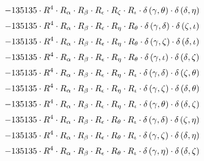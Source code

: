 \begin{subequations}
\begin{gather}
 \\[0.2em] \notag 		 - 135135 \cdot R^{4} \cdot R_{\alpha{}} \cdot R_{\beta{}} \cdot R_{\epsilon{}} \cdot R_{\zeta{}} \cdot R_{\iota{}} \cdot \delta{}\left(\gamma{}, \theta{}\right) \cdot \delta{}\left(\delta{}, \eta{}\right) 
 \\[0.2em] \notag 		 - 135135 \cdot R^{4} \cdot R_{\alpha{}} \cdot R_{\beta{}} \cdot R_{\epsilon{}} \cdot R_{\eta{}} \cdot R_{\theta{}} \cdot \delta{}\left(\gamma{}, \delta{}\right) \cdot \delta{}\left(\zeta{}, \iota{}\right) 
 \\[0.2em] \notag 		 - 135135 \cdot R^{4} \cdot R_{\alpha{}} \cdot R_{\beta{}} \cdot R_{\epsilon{}} \cdot R_{\eta{}} \cdot R_{\theta{}} \cdot \delta{}\left(\gamma{}, \zeta{}\right) \cdot \delta{}\left(\delta{}, \iota{}\right) 
 \\[0.2em] \notag 		 - 135135 \cdot R^{4} \cdot R_{\alpha{}} \cdot R_{\beta{}} \cdot R_{\epsilon{}} \cdot R_{\eta{}} \cdot R_{\theta{}} \cdot \delta{}\left(\gamma{}, \iota{}\right) \cdot \delta{}\left(\delta{}, \zeta{}\right) 
 \\[0.2em] \notag 		 - 135135 \cdot R^{4} \cdot R_{\alpha{}} \cdot R_{\beta{}} \cdot R_{\epsilon{}} \cdot R_{\eta{}} \cdot R_{\iota{}} \cdot \delta{}\left(\gamma{}, \delta{}\right) \cdot \delta{}\left(\zeta{}, \theta{}\right) 
 \\[0.2em] \notag 		 - 135135 \cdot R^{4} \cdot R_{\alpha{}} \cdot R_{\beta{}} \cdot R_{\epsilon{}} \cdot R_{\eta{}} \cdot R_{\iota{}} \cdot \delta{}\left(\gamma{}, \zeta{}\right) \cdot \delta{}\left(\delta{}, \theta{}\right) 
 \\[0.2em] \notag 		 - 135135 \cdot R^{4} \cdot R_{\alpha{}} \cdot R_{\beta{}} \cdot R_{\epsilon{}} \cdot R_{\eta{}} \cdot R_{\iota{}} \cdot \delta{}\left(\gamma{}, \theta{}\right) \cdot \delta{}\left(\delta{}, \zeta{}\right) 
 \\[0.2em] \notag 		 - 135135 \cdot R^{4} \cdot R_{\alpha{}} \cdot R_{\beta{}} \cdot R_{\epsilon{}} \cdot R_{\theta{}} \cdot R_{\iota{}} \cdot \delta{}\left(\gamma{}, \delta{}\right) \cdot \delta{}\left(\zeta{}, \eta{}\right) 
 \\[0.2em] \notag 		 - 135135 \cdot R^{4} \cdot R_{\alpha{}} \cdot R_{\beta{}} \cdot R_{\epsilon{}} \cdot R_{\theta{}} \cdot R_{\iota{}} \cdot \delta{}\left(\gamma{}, \zeta{}\right) \cdot \delta{}\left(\delta{}, \eta{}\right) 
 \\[0.2em] \notag 		 - 135135 \cdot R^{4} \cdot R_{\alpha{}} \cdot R_{\beta{}} \cdot R_{\epsilon{}} \cdot R_{\theta{}} \cdot R_{\iota{}} \cdot \delta{}\left(\gamma{}, \eta{}\right) \cdot \delta{}\left(\delta{}, \zeta{}\right) 

\end{gather}
\end{subequations}
